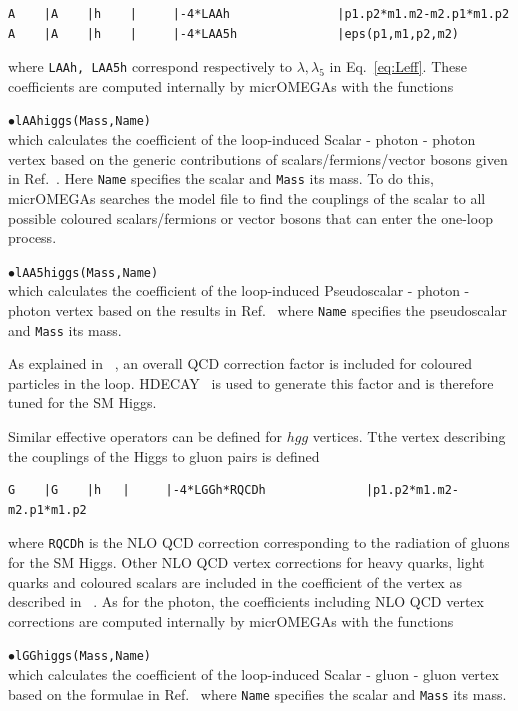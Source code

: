\documentclass[12pt,a4paper]{article}
\begin{document}
\begin{verbatim}
A    |A    |h    |     |-4*LAAh               |p1.p2*m1.m2-m2.p1*m1.p2
A    |A    |h    |     |-4*LAA5h              |eps(p1,m1,p2,m2)
\end{verbatim}
where \verb|LAAh, LAA5h| correspond respectively to $\lambda, \lambda_5$ in Eq.~\ref{eq:Leff}. These coefficients  are computed internally by micrOMEGAs with the functions

\noindent
$\bullet$\verb|lAAhiggs(Mass,Name)|\\
which calculates the coefficient of the loop-induced  Scalar - photon - photon  vertex based on the generic contributions  of scalars/fermions/vector bosons given  in Ref.~\cite{Djouadi:2005gi}. Here {\tt Name} specifies the  scalar and {\tt Mass} its mass. To do this, micrOMEGAs searches the model file to find the couplings of the scalar to all possible coloured scalars/fermions or vector bosons that can enter the one-loop process.

\noindent
$\bullet$\verb|lAA5higgs(Mass,Name)|\\
which calculates the coefficient of the loop-induced  Pseudoscalar - photon - photon   vertex based on the results in Ref.~\cite{Djouadi:2005gi} where {\tt Name} specifies the pseudoscalar and {\tt Mass} its mass. 

As explained in ~\cite{Belanger:2013oya,Belyaev:2012qa}, an overall  QCD correction factor is included for coloured particles in the loop. HDECAY~\cite{Djouadi:1997yw} is used to generate this factor and is therefore tuned for the SM Higgs.

Similar effective operators can be defined for $hgg$ vertices.  Tthe vertex describing the couplings of the Higgs to gluon pairs is defined
\begin{verbatim}
G    |G    |h   |     |-4*LGGh*RQCDh              |p1.p2*m1.m2-m2.p1*m1.p2
\end{verbatim}
where {\tt RQCDh} is the NLO QCD correction corresponding to the radiation of gluons for the SM Higgs. Other NLO QCD vertex corrections for heavy quarks, light quarks and coloured scalars are included in the coefficient of the vertex as described in ~\cite{Belanger:2013oya,Belyaev:2012qa}.
As for the photon, the coefficients  including NLO QCD vertex corrections are computed internally by micrOMEGAs with the functions

\noindent
$\bullet$\verb|lGGhiggs(Mass,Name)|\\
which calculates the coefficient of the loop-induced  Scalar - gluon - gluon  vertex based on the formulae in Ref.~\cite{Djouadi:2005gi} where {\tt Name} specifies the  scalar and {\tt Mass} its mass. 
\end{document}
